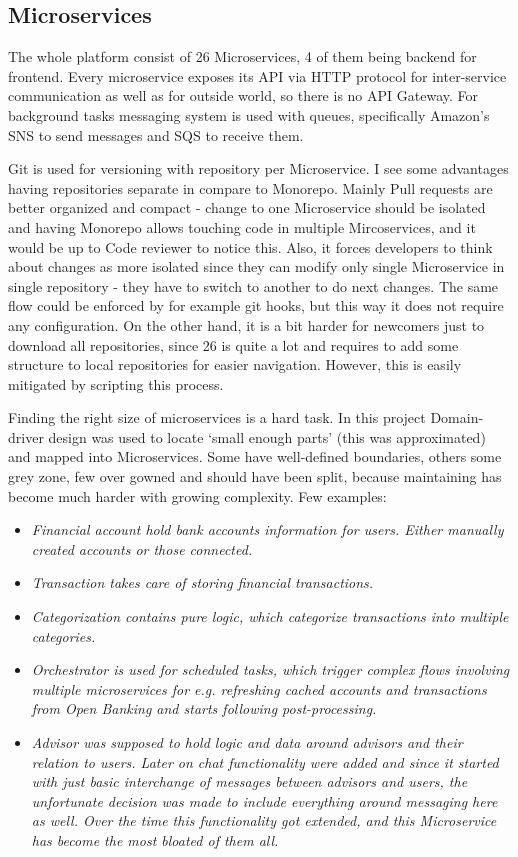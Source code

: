 \subsection{Microservices}
The whole platform consist of 26 Microservices, 4 of them being backend for frontend. Every microservice exposes its API via HTTP protocol for inter-service communication as well as for outside world, so there is no API Gateway. For background tasks messaging system is used with queues, specifically Amazon's SNS to send messages and SQS to receive them.

Git is used for versioning with repository per Microservice. I see some advantages having repositories separate in compare to Monorepo. Mainly Pull requests are better organized and compact - change to one Microservice should be isolated and having Monorepo allows touching code in multiple Mircoservices, and it would be up to Code reviewer to notice this. Also, it forces developers to think about changes as more isolated since they can modify only single Microservice in single repository - they have to switch to another to do next changes. The same flow could be enforced by for example git hooks, but this way it does not require any configuration. On the other hand, it is a bit harder for newcomers just to download all repositories, since 26 is quite a lot and requires to add some structure to local repositories for easier navigation. However, this is easily mitigated by scripting this process.

Finding the right size of microservices is a hard task. In this project Domain-driver design was used to locate `small enough parts' (this was approximated) and mapped into Microservices. Some have well-defined boundaries, others some grey zone, few over gowned and should have been split, because maintaining has become much harder with growing complexity. Few examples:

\begin{itemize}
    \item \it{Financial account} hold bank accounts information for users. Either manually created accounts or those connected.
    \item \it{Transaction} takes care of storing financial transactions.
    \item \it{Categorization} contains pure logic, which categorize transactions into multiple categories.
    \item \it{Orchestrator} is used for scheduled tasks, which trigger complex flows involving multiple microservices for e.g. refreshing cached accounts and transactions from Open Banking and starts following post-processing.
    \item \it{Advisor} was supposed to hold logic and data around advisors and their relation to users. Later on chat functionality were added and since it started with just basic interchange of messages between advisors and users, the unfortunate decision was made to include everything around messaging here as well. Over the time this functionality got extended, and this Microservice has become the most bloated of them all.
\end{itemize}


